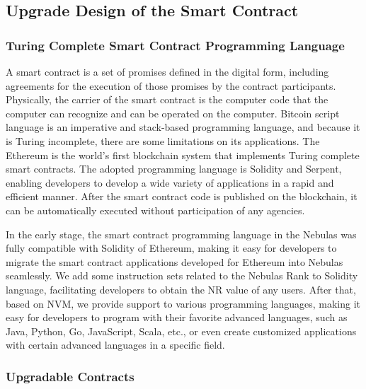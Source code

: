 \subsection{Upgrade Design of the Smart Contract}

\subsubsection{Turing Complete Smart Contract Programming Language}

A smart contract is a set of promises defined in the digital form, including agreements for the execution of those promises by the contract participants. Physically, the carrier of the smart contract is the computer code that the computer can recognize and can be operated on the computer. Bitcoin script language is an imperative and stack-based programming language, and because it is Turing incomplete, there are some limitations on its applications. The Ethereum is the world's first blockchain system that implements Turing complete smart contracts. The adopted programming language is Solidity and Serpent, enabling developers to develop a wide variety of applications in a rapid and efficient manner. After the smart contract code is published on the blockchain, it can be automatically executed without participation of any agencies.

In the early stage, the smart contract programming language in the Nebulas was fully compatible with Solidity of Ethereum, making it easy for developers to migrate the smart contract applications developed for Ethereum into Nebulas seamlessly. We add some instruction sets related to the Nebulas Rank to Solidity language, facilitating developers to obtain the NR value of any users. After that, based on NVM, we provide support to various programming languages, making it easy for developers to program with their favorite advanced languages, such as Java, Python, Go, JavaScript, Scala, etc., or even create customized applications with certain advanced languages in a specific field.

\subsubsection{Upgradable Contracts}


